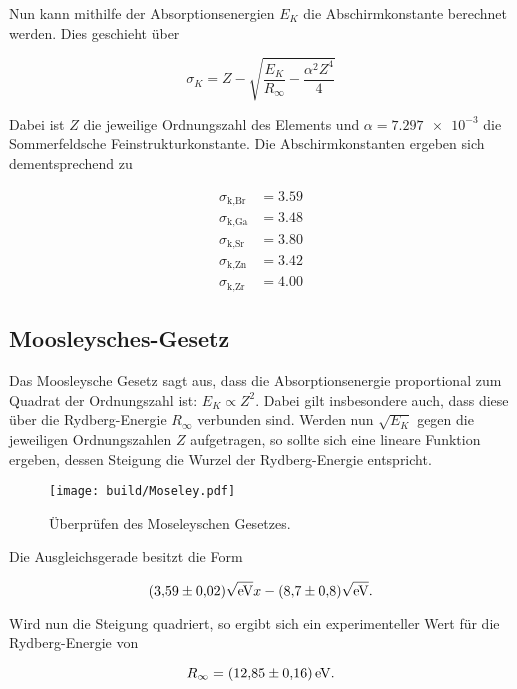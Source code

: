 \noindent Nun kann mithilfe der Absorptionsenergien $E_K$ die Abschirmkonstante berechnet werden. Dies geschieht über 

\begin{equation*}
    \sigma_K = Z - \sqrt{\frac{E_K}{R_\infty} - \frac{\alpha^2 Z^4}{4}}
\end{equation*}

\noindent Dabei ist $Z$ die jeweilige Ordnungszahl des Elements und $\alpha=\num{7.297e-3}$ die Sommerfeldsche Feinstrukturkonstante.
Die Abschirmkonstanten ergeben sich dementsprechend zu 

\begin{align*}
    \sigma_\text{k,Br} &= \num{3.59}   \\
    \sigma_\text{k,Ga} &= \num{3.48}   \\
    \sigma_\text{k,Sr} &= \num{3.80}   \\
    \sigma_\text{k,Zn} &= \num{3.42}    \\
    \sigma_\text{k,Zr} &= \num{4.00}   
\end{align*}


\subsection{Moosleysches-Gesetz}
Das Moosleysche Gesetz sagt aus, dass die Absorptionsenergie  proportional zum Quadrat der Ordnungszahl ist: $E_K \propto Z^2.$
Dabei gilt insbesondere auch, dass diese über die Rydberg-Energie $R_\infty$ verbunden sind. Werden nun $\sqrt{E_K}$ gegen die jeweiligen 
Ordnungszahlen $Z$ aufgetragen, so sollte sich eine lineare Funktion ergeben, dessen Steigung die Wurzel der Rydberg-Energie entspricht. 

\begin{figure}[H]
    \centering
    \texttt{[image: build/Moseley.pdf]}
    \caption{Überprüfen des Moseleyschen Gesetzes.}
\end{figure}

\noindent Die Ausgleichsgerade besitzt die Form 

\begin{equation*}
    (\num{3.59\pm0.02})\sqrt{\unit{\electronvolt}}x - (\num{8.7\pm0.8})\sqrt{\unit{\electronvolt}}.
\end{equation*}

\noindent Wird nun die Steigung quadriert, so ergibt sich ein experimenteller Wert für die Rydberg-Energie von 

\begin{equation*}
    R_\infty = \qty{12.85\pm0.16}{\electronvolt}.
\end{equation*}

%